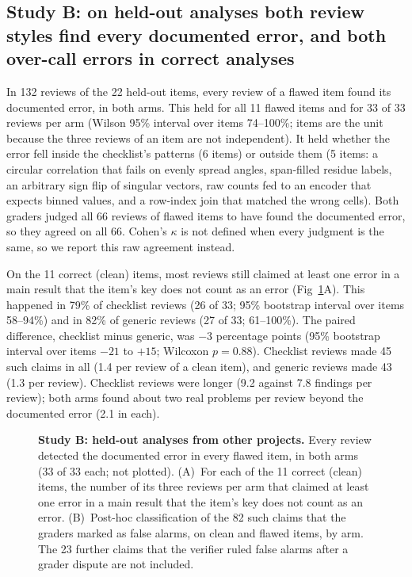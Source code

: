 \documentclass[10pt,letterpaper]{article}
\begin{document}
\subsection*{Study B: on held-out analyses both review styles find every documented error, and both over-call errors in correct analyses}
In 132 reviews of the 22 held-out items, every review of a flawed item
found its documented error, in both arms. This held for all 11 flawed
items and for 33 of 33 reviews per arm (Wilson 95\% interval over items
74--100\%; items are the unit because the three reviews of an item are
not independent). It held whether the error fell inside the
checklist's patterns (6 items) or outside them (5 items: a circular
correlation that fails on evenly spread angles, span-filled residue
labels, an arbitrary sign flip of singular vectors, raw counts fed to an
encoder that expects binned values, and a row-index join that matched the
wrong cells). Both graders judged all 66 reviews of flawed items to have
found the documented error, so they agreed on all 66. Cohen's $\kappa$
is not defined when every judgment is the same, so we report this raw
agreement instead.

On the 11 correct (clean) items, most reviews still claimed at least
one error in a main result that the item's key does not count as an
error (Fig~\ref{fig:studyB}A). This happened in 79\% of checklist
reviews (26 of 33; 95\% bootstrap interval over items 58--94\%) and in
82\% of generic reviews (27 of 33; 61--100\%). The paired difference,
checklist minus generic, was $-3$ percentage points (95\% bootstrap
interval over items $-21$ to $+15$; Wilcoxon $p=0.88$). Checklist
reviews made 45 such claims in all (1.4 per review of a clean item), and
generic reviews made 43 (1.3 per review). Checklist reviews were longer
(9.2 against 7.8 findings per review); both arms found about two real
problems per review beyond the documented error (2.1 in each).

\begin{figure}[H]
\caption{\textbf{Study B: held-out analyses from other projects.} Every
review detected the documented error in every flawed item, in both arms
(33 of 33 each; not plotted). (A)~For each of the 11 correct (clean)
items, the number of its three reviews per arm that claimed at least one
error in a main result that the item's key does not count as an error.
(B)~Post-hoc classification of the 82 such claims that the graders
marked as false alarms, on clean and flawed items, by arm. The 23
further claims that the verifier ruled false alarms after a grader
dispute are not included.}
\label{fig:studyB}
\end{figure}
\end{document}
